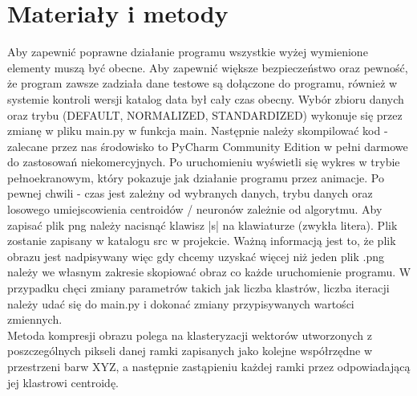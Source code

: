 \documentclass{classrep}
\begin{document}
    \section{Materiały i metody}
    {
        Aby zapewnić poprawne działanie programu wszystkie wyżej wymienione elementy muszą być obecne. Aby zapewnić większe
        bezpieczeństwo oraz pewność, że program zawsze zadziała dane testowe są dołączone do programu, również w systemie
        kontroli wersji katalog data był cały czas obecny. Wybór zbioru danych oraz trybu (DEFAULT, NORMALIZED, STANDARDIZED)
        wykonuje się przez zmianę w pliku main.py w funkcja main. Następnie należy skompilować kod - zalecane przez nas
        środowisko to PyCharm Community Edition w pełni darmowe do zastosowań niekomercyjnych. Po uruchomieniu wyświetli
        się wykres w trybie pełnoekranowym, który pokazuje jak działanie programu przez animacje. Po pewnej chwili - czas
        jest zależny od wybranych danych, trybu danych oraz losowego umiejscowienia centroidów / neuronów zależnie od algorytmu.
        Aby zapisać plik png należy nacisnąć klawisz |s| na klawiaturze (zwykła litera). Plik zostanie zapisany w katalogu src
    w projekcie. Ważną informacją jest to, że plik obrazu jest nadpisywany więc gdy chcemy uzyskać więcej niż jeden plik
    .png należy we własnym zakresie skopiować obraz co każde uruchomienie programu. W przypadku chęci zmiany parametrów
    takich jak liczba klastrów, liczba iteracji należy udać się do main.py i dokonać zmiany przypisywanych wartości zmiennych.\\

        Metoda kompresji obrazu polega na klasteryzacji wektorów utworzonych z poszczególnych pikseli danej ramki
        zapisanych jako kolejne współrzędne w przestrzeni barw XYZ, a następnie zastąpieniu każdej ramki przez
        odpowiadającą jej klastrowi centroidę.


    }
\end{document}
